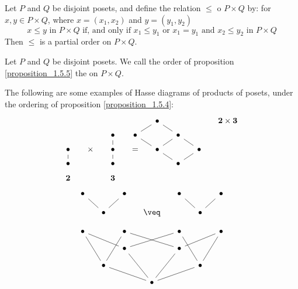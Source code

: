 \begin{proposition}\label{proposition_1.5.5}
  Let $P$ and $Q$ be disjoint posets, and define the relation $\leq$ o
   $P \times Q$ by: for $x,y \in P \times Q$, where $x=(x_1,x_2)$ and
   $y=(y_1,y_2)$
   \begin{equation*}
     x \leq y \text{ in } P \times Q \text{ if, and only if }
     x_1 \leq y_1 \text{ or } x_1=y_1 \text{ and } x_2 \leq y_2 \text{ in } P \times Q
   \end{equation*}
   Then $\leq$ is a partial order on $P \times Q$.
\end{proposition}

\begin{definition}
  Let $P$ and $Q$ be disjoint posets. We call the order of proposition
  \ref{proposition_1.5.5} the  on $P
  \times Q$.
\end{definition}

\begin{example}\label{example_1.12}
  The following are some examples of Hasse diagrams of products of
  posets, under the ordering of proposition \ref{proposition_1.5.4}:
\[\begin{tikzcd}[column  sep=small, row  sep=tiny]
	&&&& \bullet &&& {\mathbf{2} \times\mathbf{3}} \\
	&& \bullet & \bullet && \bullet \\
	\bullet & \times & \bullet & {=} & \bullet && \bullet \\
	\bullet && \bullet &&& \bullet \\
	{\mathbf{2}} && {\mathbf{3}}
	\arrow[no head, from=1-5, to=2-6]
	\arrow[no head, from=2-4, to=1-5]
	\arrow[no head, from=2-6, to=3-7]
	\arrow[no head, from=3-3, to=2-3]
	\arrow[no head, from=3-5, to=2-4]
	\arrow[no head, from=3-5, to=2-6]
	\arrow[no head, from=3-7, to=4-6]
	\arrow[no head, from=4-1, to=3-1]
	\arrow[no head, from=4-3, to=3-3]
	\arrow[no head, from=4-6, to=3-5]
\end{tikzcd}\]
\[\begin{tikzcd}[column sep=small,row sep=small]
	\bullet && \bullet && \bullet && \bullet \\
	& \bullet && {\veq} && \bullet \\
	\bullet && \bullet && \bullet && \bullet \\
	&& \bullet && \bullet \\
	& \bullet &&&& \bullet \\
	&&& \bullet
	\arrow[no head, from=2-2, to=1-1]
	\arrow[no head, from=2-2, to=1-3]
	\arrow[no head, from=2-6, to=1-5]
	\arrow[no head, from=2-6, to=1-7]
	\arrow[no head, from=3-1, to=5-2]
	\arrow[no head, from=4-3, to=3-1]
	\arrow[no head, from=4-3, to=3-5]
	\arrow[no head, from=4-5, to=3-3]
	\arrow[no head, from=4-5, to=3-7]
	\arrow[no head, from=5-2, to=3-3]
	\arrow[no head, from=5-6, to=3-5]
	\arrow[no head, from=5-6, to=3-7]
	\arrow[no head, from=6-4, to=4-3]
	\arrow[no head, from=6-4, to=4-5]
	\arrow[no head, from=6-4, to=5-2]
	\arrow[no head, from=6-4, to=5-6]
\end{tikzcd}\]
\end{example}

